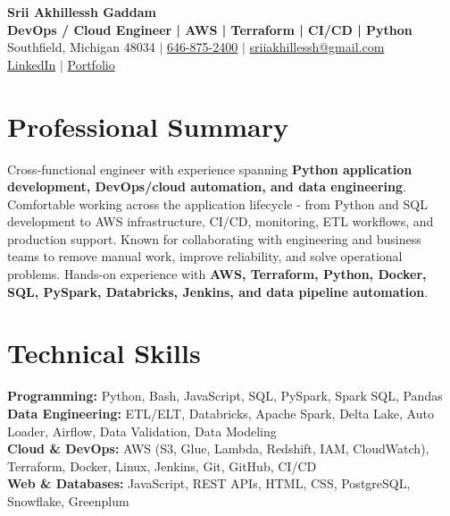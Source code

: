 \documentclass[letterpaper,10pt]{article}
\begin{document}
\fontsize{9.35pt}{10.45pt}\selectfont

\begin{center}
    {\LARGE \textbf{Srii Akhillessh Gaddam}} \\[-1pt]
    \textbf{DevOps / Cloud Engineer | AWS | Terraform | CI/CD | Python} \\[2pt]
    Southfield, Michigan 48034 $|$
    \href{tel:6468752400}{646-875-2400} $|$
    \href{mailto:sriiakhillessh@gmail.com}{sriiakhillessh@gmail.com} \\[1pt]
    \href{https://www.linkedin.com/in/srii-akhiilessh-gaddam-b48668191/}{LinkedIn} $|$
    \href{https://sriiakhillesshg.github.io/portfolio/}{Portfolio}
\end{center}
\vspace{-8pt}

\section{Professional Summary}
\small{Cross-functional engineer with experience spanning \textbf{Python application development, DevOps/cloud automation, and data engineering}. Comfortable working across the application lifecycle - from Python and SQL development to AWS infrastructure, CI/CD, monitoring, ETL workflows, and production support. Known for collaborating with engineering and business teams to remove manual work, improve reliability, and solve operational problems. Hands-on experience with \textbf{AWS, Terraform, Python, Docker, SQL, PySpark, Databricks, Jenkins, and data pipeline automation}.}

\section{Technical Skills}
\small{
\textbf{Programming:} Python, Bash, JavaScript, SQL, PySpark, Spark SQL, Pandas \\
\textbf{Data Engineering:} ETL/ELT, Databricks, Apache Spark, Delta Lake, Auto Loader, Airflow, Data Validation, Data Modeling \\
\textbf{Cloud \& DevOps:} AWS (S3, Glue, Lambda, Redshift, IAM, CloudWatch), Terraform, Docker, Linux, Jenkins, Git, GitHub, CI/CD \\
\textbf{Web \& Databases:} JavaScript, REST APIs, HTML, CSS, PostgreSQL, Snowflake, Greenplum
}
\end{document}
